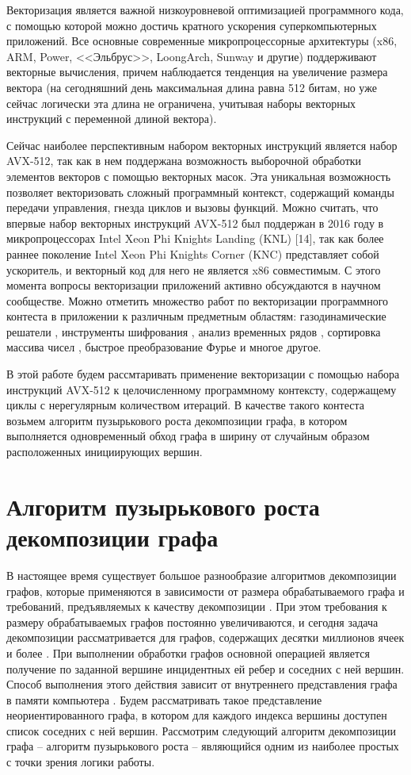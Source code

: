\documentclass[
11pt,%
tightenlines,%
twoside,%
onecolumn,%
nofloats,%
nobibnotes,%
nofootinbib,%
superscriptaddress,%
noshowpacs,%
centertags]%
{revtex4}
\begin{document}
Векторизация является важной низкоуровневой оптимизацией программного кода, с помощью которой можно достичь кратного ускорения суперкомпьютерных приложений.
Все основные современные микропроцессорные архитектуры (x86, ARM, Power, <<Эльбрус>>, LoongArch, Sunway и другие) поддерживают векторные вычисления, причем наблюдается тенденция на увеличение размера вектора (на сегодняшний день максимальная длина равна 512 битам, но уже сейчас логически эта длина не ограничена, учитывая наборы векторных инструкций с переменной длиной
вектора).

Сейчас наиболее перспективным набором векторных инструкций является набор AVX-512, так как в нем поддержана возможность выборочной обработки элементов векторов с помощью векторных масок.
Эта уникальная возможность позволяет векторизовать сложный программный контекст, содержащий команды передачи управления, гнезда циклов и вызовы функций.
Можно считать, что впервые набор векторных инструкций AVX-512 был поддержан в 2016 году в микропроцессорах Intel Xeon Phi Knights Landing (KNL) [14], так как более раннее поколение Intel Xeon Phi Knights Corner (KNC) представляет собой ускоритель, и векторный код для него не является x86 совместимым.
С этого момента вопросы векторизации приложений активно обсуждаются в научном сообществе.
Можно отметить множество работ по векторизации программного контеста в приложении к различным предметным областям: газодинамические решатели \cite{12-1Kulikov}, инструменты шифрования \cite{12-2Buhrow}, анализ временных рядов \cite{12-3Quislant}, сортировка массива чисел \cite{12-4Blacher}, быстрое преобразование Фурье \cite{12-5Sansone} и многое другое.

В этой работе будем рассмтаривать применение векторизации с помощью набора инструкций AVX-512 к целочисленному программному контексту, содержащему циклы с нерегулярным количеством итераций.
В качестве такого контеста возьмем алгоритм пузырькового роста декомпозиции графа, в котором выполняется одновременный обход графа в ширину от случайным образом расположенных инициирующих вершин.

\section{Алгоритм пузырькового роста декомпозиции графа}

В настоящее время существует большое разнообразие алгоритмов декомпозиции графов, которые применяются в зависимости от размера обрабатываемого графа и требований, предъявляемых к качеству декомпозиции \cite{13Ayall}.
При этом требования к размеру обрабатываемых графов постоянно увеличиваются, и сегодня задача декомпозиции рассматривается для графов, содержащих десятки миллионов ячеек и более \cite{14Lee}.
При выполнении обработки графов основной операцией является получение по заданной вершине инцидентных ей ребер и соседних с ней вершин.
Способ выполнения этого действия зависит от внутреннего представления графа в памяти компьютера \cite{15Ahmed,16Salwasser}.
Будем рассматривать такое представление неориентированного графа, в котором для каждого индекса вершины доступен список соседних с ней вершин.
Рассмотрим следующий алгоритм декомпозиции графа -- алгоритм пузырькового роста -- являющийся одним из наиболее простых с точки зрения логики работы.
\end{document}
